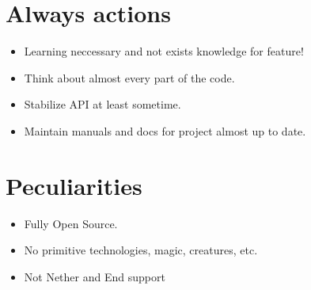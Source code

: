 \documentclass[12pt]{article}
\begin{document}
	\section{Always actions}

	\begin{itemize}
		\item Learning neccessary and not exists knowledge for feature!
		\item Think about almost every part of the code.
		\item Stabilize API at least sometime.
		\item Maintain manuals and docs for project almost up to date.
	\end{itemize}

	\section{Peculiarities}

	\begin{itemize}
		\item Fully Open Source.
		\item No primitive technologies, magic, creatures, etc.
		\item Not Nether and End support
	\end{itemize}
\end{document}
